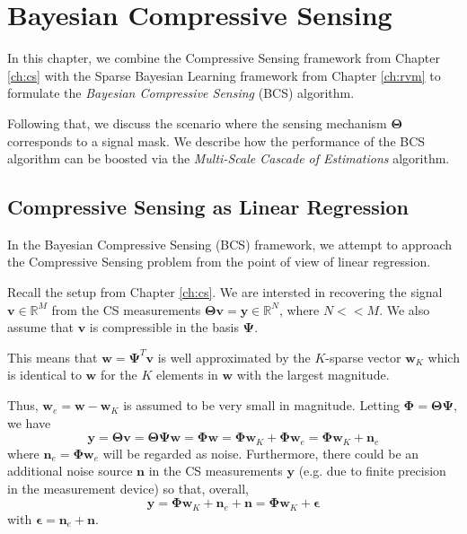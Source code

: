 \chapter{Bayesian Compressive Sensing}
\label{ch:msce}

In this chapter, we combine the Compressive Sensing framework from Chapter \ref{ch:cs} with the Sparse Bayesian Learning framework from Chapter \ref{ch:rvm} to formulate the \emph{Bayesian Compressive Sensing} (BCS) algorithm.

Following that, we discuss the scenario where the sensing mechanism $\bm\Theta$ corresponds to a signal mask.
We describe how the performance of the BCS algorithm can be boosted via the \emph{Multi-Scale Cascade of Estimations} algorithm.

\section{Compressive Sensing as Linear Regression}
In the Bayesian Compressive Sensing (BCS) \cite{ji2008} framework, we attempt to approach the Compressive Sensing problem from the point of view of linear regression.

Recall the setup from Chapter \ref{ch:cs}.
We are intersted in recovering the signal $\bm v\in\mathbb{R}^M$ from the CS measurements $\bm\Theta\bm v = \bm y\in\mathbb{R}^N$, where $N << M$.
We also assume that $\bm v$ is compressible in the basis $\bm \Psi$.

This means that $\bm w = \bm\Psi^T\bm v$ is well approximated by the $K$-sparse vector $\bm w_K$ which is identical to $\bm w$ for the $K$ elements in $\bm w$ with the largest magnitude.

Thus, $\bm w_e = \bm w - \bm w_K$ is assumed to be very small in magnitude.
Letting $\bm\Phi=\bm\Theta\bm\Psi$, we have
\begin{equation*}
  \bm y = \bm\Theta\bm v = \bm\Theta\bm\Psi\bm w = \bm\Phi\bm w = \bm\Phi\bm w_K + \bm\Phi\bm w_e = \bm\Phi\bm w_K + \bm n_e
\end{equation*}
where $\bm n_e = \bm\Phi\bm w_e$ will be regarded as noise.
Furthermore, there could be an additional noise source $\bm n$ in the CS measurements $\bm y$ (e.g. due to finite precision in the measurement device) so that, overall,
\begin{equation}
\label{eqn:bcs_setup}
  \bm y = \bm\Phi\bm w_K + \bm n_e + \bm n = \bm\Phi\bm w_K + \bm \epsilon
\end{equation}
with $\bm\epsilon = \bm n_e + \bm n$.

